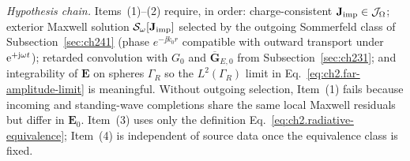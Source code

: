 \noindent\textit{Hypothesis chain.}
Items~(1)--(2) require, in order: charge-consistent $\mathbf{J}_{\mathrm{imp}}\in\mathcal{J}_\Omega$;
exterior Maxwell solution $\mathcal{S}_\omega[\mathbf{J}_{\mathrm{imp}}]$ selected by the outgoing Sommerfeld class of
Subsection~\ref{sec:ch241} (phase $e^{-\jj k_0 r}$ compatible with outward transport under $\mathrm{e}^{+\mathrm{j}\omega t}$);
retarded convolution with $G_0$ and $\overline{\mathbf{G}}_{E,0}$ from Subsection~\ref{sec:ch231};
and integrability of $\mathbf{E}$ on spheres $\Gamma_R$ so the $L^{2}(\Gamma_R)$ limit in
Eq.~\eqref{eq:ch2.far-amplitude-limit} is meaningful.
Without outgoing selection, Item~(1) fails because incoming and standing-wave completions share the
same local Maxwell residuals but differ in $\mathbf{E}_0$.
Item~(3) uses only the definition Eq.~\eqref{eq:ch2.radiative-equivalence}; Item~(4) is independent of
source data once the equivalence class is fixed.

